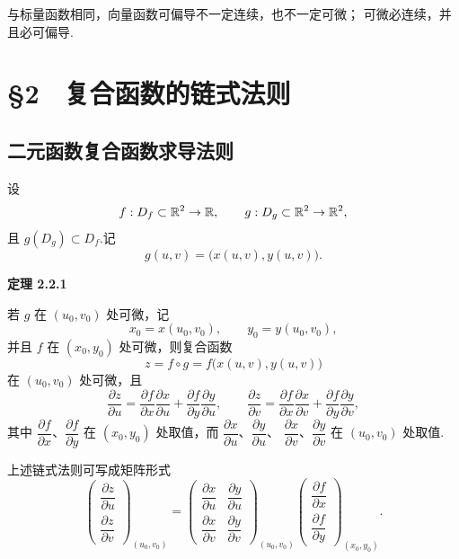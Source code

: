 与标量函数相同，向量函数可偏导不一定连续，也不一定可微；
可微必连续，并且必可偏导.







\section*{§2　复合函数的链式法则}

\subsection*{二元函数复合函数求导法则}

设
\[
f:D_f\subset\mathbb{R}^2\to\mathbb{R},
\qquad
g:D_g\subset\mathbb{R}^2\to\mathbb{R}^2,
\]
且 $g(D_g)\subset D_f$.记
\[
g(u,v)=\bigl(x(u,v),y(u,v)\bigr).
\]



\textbf{定理 2.2.1}

若 $g$ 在 $(u_0,v_0)$ 处可微，记
	\[
	x_0=x(u_0,v_0),\qquad y_0=y(u_0,v_0),
	\]
	并且 $f$ 在 $(x_0,y_0)$ 处可微，则复合函数
	\[
	z=f\circ g=f\bigl(x(u,v),y(u,v)\bigr)
	\]
	在 $(u_0,v_0)$ 处可微，且
	\[
	\frac{\partial z}{\partial u}
	=
	\frac{\partial f}{\partial x}\frac{\partial x}{\partial u}
	+
	\frac{\partial f}{\partial y}\frac{\partial y}{\partial u},
	\qquad
	\frac{\partial z}{\partial v}
	=
	\frac{\partial f}{\partial x}\frac{\partial x}{\partial v}
	+
	\frac{\partial f}{\partial y}\frac{\partial y}{\partial v},
	\]
	其中 $\dfrac{\partial f}{\partial x}$、$\dfrac{\partial f}{\partial y}$
	在 $(x_0,y_0)$ 处取值，而
	$\dfrac{\partial x}{\partial u}$、$\dfrac{\partial y}{\partial u}$、
	$\dfrac{\partial x}{\partial v}$、$\dfrac{\partial y}{\partial v}$
	在 $(u_0,v_0)$ 处取值.




上述链式法则可写成矩阵形式
\[
\begin{pmatrix}
\dfrac{\partial z}{\partial u}\\[5pt]
\dfrac{\partial z}{\partial v}
\end{pmatrix}_{(u_0,v_0)}
=
\begin{pmatrix}
\dfrac{\partial x}{\partial u}
&\dfrac{\partial y}{\partial u}\\[5pt]
\dfrac{\partial x}{\partial v}
&\dfrac{\partial y}{\partial v}
\end{pmatrix}_{(u_0,v_0)}
\begin{pmatrix}
\dfrac{\partial f}{\partial x}\\[5pt]
\dfrac{\partial f}{\partial y}
\end{pmatrix}_{(x_0,y_0)}.
\]



